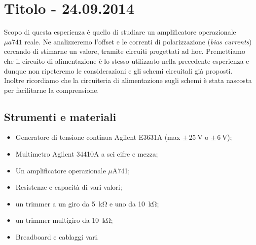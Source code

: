\section{Titolo - 24.09.2014}

Scopo di questa esperienza è quello di studiare un amplificatore operazionale $\mu a 741$ reale.
Ne analizzeremo l'offset e le correnti di polarizzazione (\textit{bias currents}) cercando di stimarne un valore, tramite circuiti progettati ad hoc.
Premettiamo che il circuito di alimentazione è lo stesso utilizzato nella precedente esperienza e dunque non ripeteremo le considerazioni e gli schemi circuitali già proposti.
Inoltre ricordiamo che la circuiteria di alimentazione sugli schemi è stata nascosta per facilitarne la comprensione.

\subsection{Strumenti e materiali}

\begin{itemize} [noitemsep]
\item Generatore di tensione continua Agilent E3631A (max $\pm \, \SI{25}{\volt}$ o $\pm \, \SI{6}{\volt}$);
\item Multimetro Agilent 34410A a sei cifre e mezza;
\item Un amplificatore operazionale $\mu$A741;
\item Resistenze e capacità di vari valori;
\item un trimmer a un giro da \SI{5}{\kilo\ohm} e uno da \SI{10}{\kilo\ohm};
\item un trimmer multigiro da \SI{10}{\kilo\ohm};
\item Breadboard e cablaggi vari.
\end{itemize}

